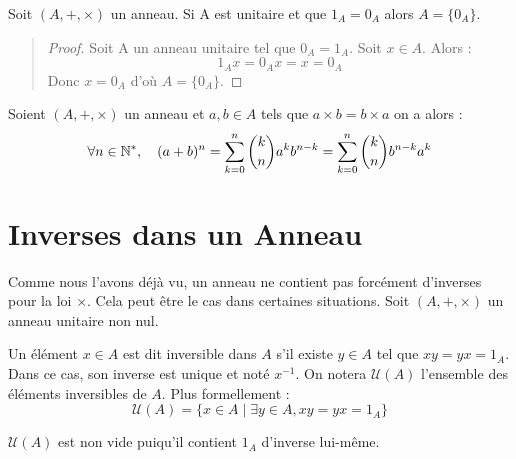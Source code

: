 \begin{remark}
    Soit $(A,+,\times)$ un anneau. Si A est unitaire et que $1_A = 0_A$ alors $A = \{0_A\}$. 
\end{remark}

\begin{quote}
    \begin{footnotesize}
        \begin{proof}
            Soit A un anneau unitaire tel que $0_A = 1_A$. Soit $x \in A$. Alors : 
                \[ 1_A x = 0_A x = x = 0_A \] 
            Donc $x = 0_A$ d'où $A = \{0_A\}$. 
        \end{proof}
    \end{footnotesize}
\end{quote}

\begin{proposition}
    Soient $(A,+,\times)$ un anneau et $a,b \in A$ tels que $a \times b = b \times a$ on a alors :
        \[ \forall n \in \mathbb{N}^*, \quad (a+b)^n  = \sum_{k=0}^{n} \binom{k}{n} a^k b^{n-k} = \sum_{k=0}^{n} \binom{k}{n} b^{n-k} a^k \] 
\end{proposition}


\section{Inverses dans un Anneau}

Comme nous l'avons déjà vu, un anneau ne contient pas forcément d'inverses pour la loi $\times$. 
Cela peut être le cas dans certaines situations. 
Soit $(A,+,\times)$ un anneau unitaire non nul. 

\begin{definition}
    Un élément $x \in A$ est dit inversible dans $A$ s'il existe $y \in A$ tel que $xy = yx = 1_A$. 
    Dans ce cas, son inverse est unique et noté $x^{-1}$. 
    On notera $\mathcal{U}(A)$ l'ensemble des éléments inversibles de $A$. Plus formellement : 
        \[ \boxed{ \mathcal{U}(A) = \{x \in A \; | \; \exists y \in A, xy = yx = 1_A \} } \] 
\end{definition}

\begin{remark}
    $\mathcal{U}(A)$ est non vide puiqu'il contient $1_A$ d'inverse lui-même. 
\end{remark}


